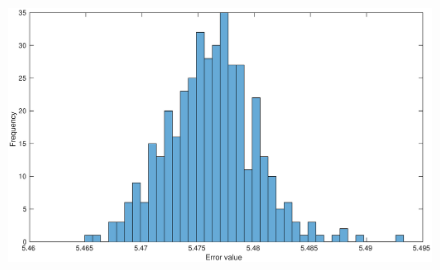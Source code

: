 \documentclass[10pt,journal]{./IEEE_latex_class/IEEEtran}
\begin{document}
\begin{figure}[h]	
    \centering
        \includegraphics[scale = 0.25]{13_9_f_simplified}
        \caption{}
        \label{13_9_f_simplified} 
\end{figure}
\end{document}
